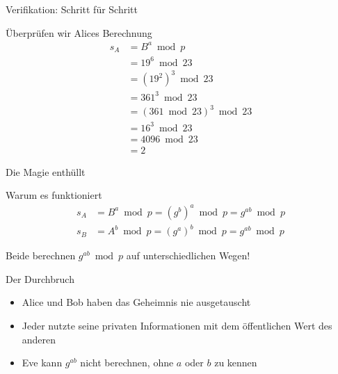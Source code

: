 \documentclass[handout]{beamer}
\begin{document}
\begin{frame}{Verifikation: Schritt für Schritt}
\begin{block}{Überprüfen wir Alices Berechnung}
\begin{align*}
s_A &= B^a \bmod p \\
    &= 19^6 \bmod 23 \\
    &= (19^2)^3 \bmod 23 \\
    &= 361^3 \bmod 23 \\
    &= (361 \bmod 23)^3 \bmod 23 \\
    &= 16^3 \bmod 23 \\
    &= 4096 \bmod 23 \\
    &= 2
\end{align*}
\end{block}
\end{frame}

\begin{frame}{Die Magie enthüllt}
\begin{block}{Warum es funktioniert}
\begin{align*}
s_A &= B^a \bmod p = (g^b)^a \bmod p = g^{ab} \bmod p \\
s_B &= A^b \bmod p = (g^a)^b \bmod p = g^{ab} \bmod p
\end{align*}

Beide berechnen $g^{ab} \bmod p$ auf unterschiedlichen Wegen!
\end{block}

\pause

\begin{exampleblock}{Der Durchbruch}
\begin{itemize}
    \item Alice und Bob haben das Geheimnis nie ausgetauscht
    \item Jeder nutzte seine privaten Informationen mit dem öffentlichen Wert des anderen
    \item Eve kann $g^{ab}$ nicht berechnen, ohne $a$ oder $b$ zu kennen
\end{itemize}
\end{exampleblock}
\end{frame}
\end{document}
